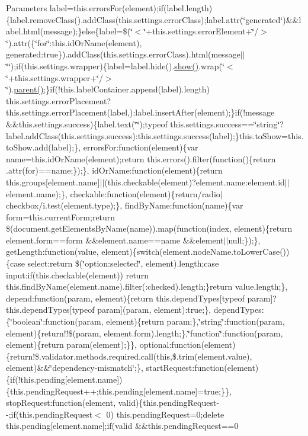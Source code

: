 \begin{DoxyParams}{Parameters}
label=this.\+errors\+For(element);if(label.\+length)\{label.\+remove\+Class().add\+Class(this.\+settings.\+error\+Class);label.\+attr(\char`\"{}generated\char`\"{})\&\&label.\+html(message);\}else\{label=\$(\char`\"{}$<$\char`\"{}+this.settings.\+error\+Element+\char`\"{}/$>$\char`\"{}).attr(\{\char`\"{}for\char`\"{}\+:this.\+id\+Or\+Name(element), generated\+:true\}).add\+Class(this.\+settings.\+error\+Class).html(message$\vert$$\vert$\char`\"{}\char`\"{});if(this.\+settings.\+wrapper)\{label=label.\+hide().\hyperlink{jquery-1_810_82-vsdoc_8js_a8dcdb81268297f0ecf76be5e6aebd05c}{show()}.wrap(\char`\"{}$<$\char`\"{}+this.settings.\+wrapper+\char`\"{}/$>$\char`\"{}).\hyperlink{jquery-1_810_82-vsdoc_8js_aed9b5e7a755bcccb282f9b06c00a6822}{parent()};\}if(!this.label\+Container.\+append(label).length) this.\+settings.\+error\+Placement?this.\+settings.\+error\+Placement(label,)\+:label.\+insert\+After(element);\}if(!message \&\&this.\+settings.\+success)\{label.\+text(\char`\"{}\char`\"{});typeof this.\+settings.\+success==\char`\"{}string\char`\"{}?label.\+add\+Class(this.\+settings.\+success)\+:this.\+settings.\+success(label);\}this.\+to\+Show=this.\+to\+Show.\+add(label);\}, errors\+For\+:function(element)\{var name=this.\+id\+Or\+Name(element);return this.\+errors().filter(function()\{return .attr(\textquotesingle{}for\textquotesingle{})==name;\});\}, id\+Or\+Name\+:function(element)\{return this.\+groups\mbox{[}element.\+name\mbox{]}$\vert$$\vert$(this.\+checkable(element)?element.\+name\+:element.\+id$\vert$$\vert$element.name);\}, checkable\+:function(element)\{return/radio$\vert$checkbox/i.test(element.\+type);\}, find\+By\+Name\+:function(name)\{var form=this.\+current\+Form;return \$(document.\+get\+Elements\+By\+Name(name)).map(function(index, element)\{return element.\+form==form \&\&element.\+name==name \&\&element$\vert$$\vert$null;\});\}, get\+Length\+:function(value, element)\{switch(element.\+node\+Name.\+to\+Lower\+Case())\{case \textquotesingle{}select\textquotesingle{}\+:return \$(\char`\"{}option\+:selected\char`\"{}, element).length;case \textquotesingle{}input\textquotesingle{}\+:if(this.\+checkable(element)) return this.\+find\+By\+Name(element.\+name).filter(\textquotesingle{}\+:checked\textquotesingle{}).length;\}return value.\+length;\}, depend\+:function(param, element)\{return this.\+depend\+Types\mbox{[}typeof param\mbox{]}?this.\+depend\+Types\mbox{[}typeof param\mbox{]}(param, element)\+:true;\}, depend\+Types\+:\{\char`\"{}boolean\char`\"{}\+:function(param, element)\{return param;\},\char`\"{}string\char`\"{}\+:function(param, element)\{return!!\$(param, element.\+form).length;\},\char`\"{}function\char`\"{}\+:function(param, element)\{return param(element);\}\}, optional\+:function(element)\{return!\$.validator.\+methods.\+required.\+call(this,\$.trim(element.\+value), element)\&\&\char`\"{}dependency-\/mismatch\char`\"{};\}, start\+Request\+:function(element)\{if(!this.pending\mbox{[}element.\+name\mbox{]})\{this.\+pending\+Request++;this.\+pending\mbox{[}element.\+name\mbox{]}=true;\}\}, stop\+Request\+:function(element, valid)\{this.\+pending\+Request-\/-\/;if(this.\+pending\+Request$<$ 0) this.\+pending\+Request=0;delete this.\+pending\mbox{[}element.\+name\mbox{]};if(valid \&\&this.\+pending\+Request==0 
\end{DoxyParams}
